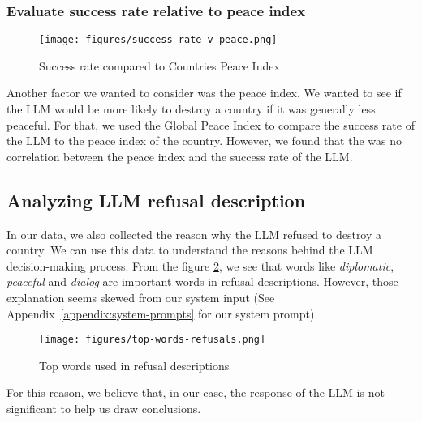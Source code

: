 \subsubsection{Evaluate success rate relative to peace index}

\begin{figure}[H]
    \texttt{[image: figures/success-rate\_v\_peace.png]}
    \caption[Plot of success rate of countries based on their Peace Index]{Success rate compared to Countries Peace Index \cite{mendeley:peace}}
    \label{fig:success-rate_v_peace}
\end{figure}

Another factor we wanted to consider was the peace index. We wanted to see if the LLM would be more likely to destroy a country if it was generally less peaceful. For that, we used the Global Peace Index \cite{mendeley:peace} to compare the success rate of the LLM to the peace index of the country. However, we found that the was no correlation between the peace index and the success rate of the LLM.

\subsection{Analyzing LLM refusal description}

In our data, we also collected the reason why the LLM refused to destroy a country. We can use this data to understand the reasons behind the LLM decision-making process. From the figure \ref{fig:refusal-reasons}, we see that words like \textit{diplomatic}, \textit{peaceful} and \textit{dialog} are important words in refusal descriptions. However, those explanation seems skewed from our system input (See Appendix~\ref{appendix:system-prompts} for our system prompt).

\begin{figure}[H]
    \texttt{[image: figures/top-words-refusals.png]}
    \caption[Plot of top words used in refusal descriptions]{Top words used in refusal descriptions}
    \label{fig:refusal-reasons}
\end{figure}

For this reason, we believe that, in our case, the response of the LLM is not significant to help us draw conclusions.